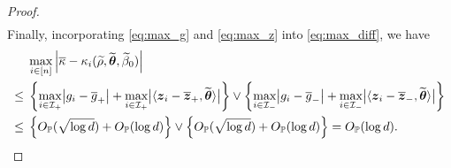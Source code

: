 \begin{proof}
\begin{align}
\end{align}
Finally, incorporating \cref{eq:max_g} and \cref{eq:max_z} into \cref{eq:max_diff}, we have
\begin{align*}
        & \max_{i \in [n]} \left|{\overline\kappa - \kappa_i(\widetilde\rho, \widetilde{{\boldsymbol{\theta}}}, \widetilde\beta_0)}\right|
        \\
        \le {} & \left\{ 
            \max_{i \in \mathcal{I}_+} \bigl|g_i - \overline g_+\bigr|
            + \max_{i \in \mathcal{I}_+} \bigl|\langle \text{\boldmath $z$}_i - \overline{\text{\boldmath $z$}}_+, \widetilde{{\boldsymbol{\theta}}} \rangle\bigr|
        \right\}
        \vee
        \left\{ 
            \max_{i \in \mathcal{I}_-} \bigl|g_i - \overline g_-\bigr|
            + \max_{i \in \mathcal{I}_-} \bigl|\langle \text{\boldmath $z$}_i - \overline{\text{\boldmath $z$}}_-, \widetilde{{\boldsymbol{\theta}}} \rangle\bigr|
        \right\} \\
        \le {} & \left\{ O_{\mathbb{P}}(\sqrt{\log d}) + O_{\mathbb{P}}(\log d) \right\} \vee \left\{ O_{\mathbb{P}}(\sqrt{\log d}) + O_{\mathbb{P}}(\log d) \right\} 
        = O_{\mathbb{P}}(\log d).
\end{align*}

\end{proof}
